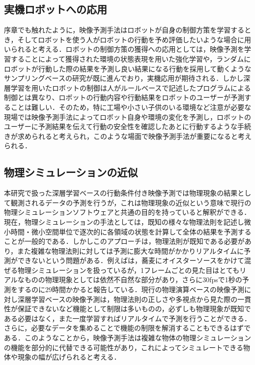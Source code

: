 \subsection{実機ロボットへの応用}
序章でも触れたように，映像予測手法はロボットが自身の制御方策を学習するとき，そしてロボットを使う人がロボットの行動を予め評価したいような場合に用いられると考える．ロボットの制御方策の獲得への応用としては，映像予測を学習することによって獲得された環境の状態表現を用いた強化学習や，ランダムにロボットが行動した際の結果を予測し良い結果になる行動を採用して動くようなサンプリングベースの研究が既に進んでおり，実機応用が期待される．しかし深層学習を用いたロボットの制御は人がルールベースで記述したプログラムによる制御とは異なり、ロボットの行動内容や行動結果をロボットのユーザーが予測することは難しい．そのため，特に工場や小さい子供のいる環境など注意が必要な現場では映像予測手法によってロボット自身や環境の変化を予測し，ロボットのユーザーに予測結果を伝えて行動の安全性を確認したあとに行動するような手続きが求められると考えられ，このような場面で映像予測手法が重要になると考えられる．

\subsection{物理シミュレーションの近似}

本研究で扱った深層学習ベースの行動条件付き映像予測では物理現象の結果として観測されるデータの予測を行うが，これは物理現象の近似という意味で現行の物理シミュレーションソフトウェアと共通の目的を持っていると解釈ができる．現在，物理シミュレーションの手法としては，既知の様々な物理法則を記述し微小時間・微小空間単位で逐次的に各領域の状態を計算して全体の結果を予測することが一般的である．しかしこのアプローチは，物理法則が既知である必要があり，また複雑な物理法則に対しては予測に膨大な時間がかかりリアルタイムに予測ができないという問題がある．例えば\cite{fei2019multi}は，蕎麦にオイスターソースをかけて混ぜる物理シミュレーションを扱っているが，1フレームごとの見た目はとてもリアルなものの物理現象としては依然不自然な部分があり，さらに30fpsで1秒の予測をするのに29時間かかると報告している．現行の物理演算ベースの映像予測に対し深層学習ベースの映像予測は，物理法則の正しさや多視点から見た際の一貫性が保証できないなど機能として制限は多いものの，必ずしも物理現象が既知である必要はなく，また一度学習すればリアルタイムで予測を行うことができる．さらに，必要なデータを集めることで機能の制限を解消することもできるはずである．このようなことから，映像予測手法は複雑な物体の物理シミュレーションの機能を部分的に代替できる可能性があり，これによってシミュレートできる物体や現象の幅が広げられると考える．

